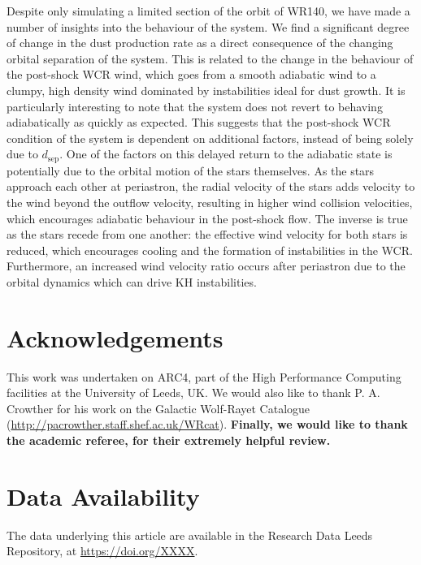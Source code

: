 \documentclass[fleqn,usenatbib]{mnras}
\newcommand{\rms}[1]{\ensuremath{_{\text{#1}}}}
\begin{document}
Despite only simulating a limited section of the orbit of WR140, we have made a number of insights into the behaviour of the system.
We find a significant degree of change in the dust production rate as a direct consequence of the changing orbital separation of the system.
This is related to the change in the behaviour of the post-shock WCR wind, which goes from a smooth adiabatic wind to a clumpy, high density wind dominated by instabilities ideal for dust growth.
It is particularly interesting to note that the system does not revert to behaving adiabatically as quickly as expected.
This suggests that the post-shock WCR condition of the system is dependent on additional factors, instead of being solely due to $d\rms{sep}$.
One of the factors on this delayed return to the adiabatic state is potentially due to the orbital motion of the stars themselves.
As the stars approach each other at periastron, the radial velocity of the stars adds velocity to the wind beyond the outflow velocity, resulting in higher wind collision velocities, which encourages adiabatic behaviour in the post-shock flow.
The inverse is true as the stars recede from one another: the effective wind velocity for both stars is reduced, which encourages cooling and the formation of instabilities in the WCR.
Furthermore, an increased wind velocity ratio occurs after periastron due to the orbital dynamics which can drive KH instabilities.


\section*{Acknowledgements}

This work was undertaken on ARC4, part of the High Performance Computing facilities at the University of Leeds, UK.
We would also like to thank P. A. Crowther for his work on the Galactic Wolf-Rayet Catalogue (\url{http://pacrowther.staff.shef.ac.uk/WRcat}).
\textbf{Finally, we would like to thank the academic referee, for their extremely helpful review.}

\section*{Data Availability}
The data underlying this article are available in the Research Data Leeds Repository, at \url{https://doi.org/XXXX}.





\bsp	%
\label{lastpage}
\end{document}

